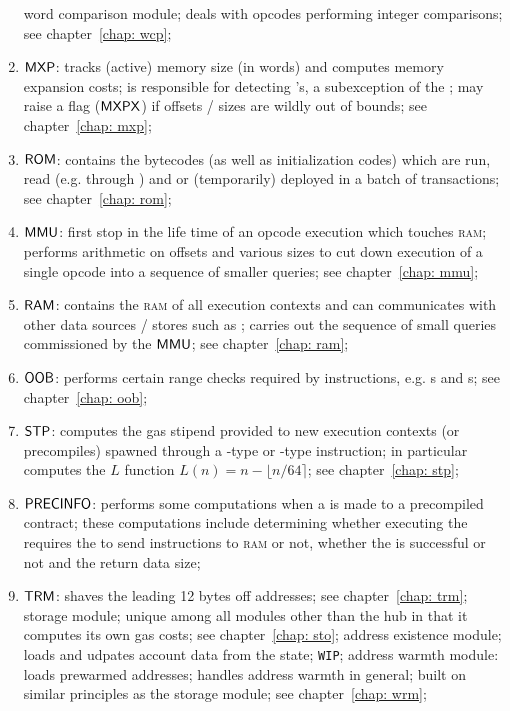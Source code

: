\begin{enumerate}
		word comparison module;
		deals with opcodes performing integer comparisons;
		see chapter~\ref{chap: wcp};
	\item $\textsf{MXP}{}$:
		tracks (active) memory size (in \evm{} words) and computes memory expansion costs;
		is responsible for detecting \mxpxSH{}'s, a subexception of the \oogxSH{};
		may raise a flag ($\textsf{MXPX}$) if offsets / sizes are wildly out of bounds;
		see chapter~\ref{chap: mxp};
	\item $\textsf{ROM}{}$:
		contains the bytecodes (as well as initialization codes) which are run, read (e.g. through ) and or (temporarily) deployed in a batch of transactions;
		see chapter~\ref{chap: rom};
	\item $\textsf{MMU}{}$:
		first stop in the life time of an opcode execution which touches \textsc{ram};
		performs arithmetic on offsets and various sizes to cut down execution of a single opcode into a sequence of smaller queries;
		see chapter~\ref{chap: mmu};
	\item $\textsf{RAM}{}$:
		contains the \textsc{ram} of all execution contexts and can communicates with other data sources / stores such as \romMod{};
		carries out the sequence of small queries commissioned by the $\textsf{MMU}{}$;
		see chapter~\ref{chap: ram};
	\item $\textsf{OOB}{}$:
		performs certain range checks required by instructions, e.g. s and s;
		see chapter~\ref{chap: oob};
	\item $\textsf{STP}$:
		computes the gas stipend provided to new execution contexts (or precompiles) spawned through a -type or -type instruction;
		in particular computes the $L$ function $L(n) = n - \lfloor n/64 \rceil$; 
		see chapter~\ref{chap: stp};
	\item $\textsf{PRECINFO}$:
		performs some computations when a  is made to a precompiled contract;
		these computations include determining whether executing the  requires the \hubMod{} to send instructions to \textsc{ram} or not, whether the  is successful or not and the return data size; 
	\item $\textsf{TRM}{}$:
		shaves the leading 12 bytes off addresses; see chapter~\ref{chap: trm};
		storage module; unique among all modules other than the hub in that it computes its own gas costs; see chapter~\ref{chap: sto};
		address existence module; loads and udpates account data from the state; \texttt{WIP};
		address warmth module: loads prewarmed addresses; handles address warmth in general; built on similar principles as the storage module; see chapter~\ref{chap: wrm};
\end{enumerate}
